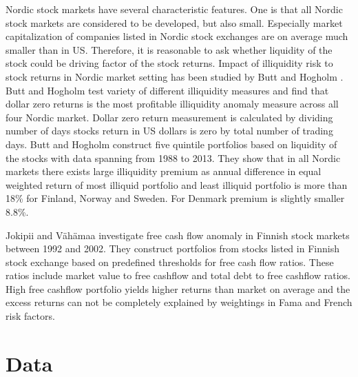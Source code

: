 \documentclass{article}
\begin{document}
Nordic stock markets have several characteristic features. One is that all Nordic stock markets are considered to be developed, but also small. Especially market capitalization of companies listed in Nordic stock exchanges are on average much smaller than in US. Therefore, it is reasonable to ask whether liquidity of the stock could be driving factor of the stock returns. Impact of illiquidity risk to stock returns in Nordic market setting has been studied by Butt and Hogholm \citeyear{ButtHogholm2020}. Butt and Hogholm test variety of different illiquidity measures and find that dollar zero returns is the most profitable illiquidity anomaly measure across all four Nordic market. Dollar zero return measurement is calculated by dividing number of days stocks return in US dollars is zero by total number of trading days. Butt and Hogholm construct five quintile portfolios based on liquidity of the stocks with data spanning from 1988 to 2013. They show that in all Nordic markets there exists large illiquidity premium as annual difference in equal weighted return of most illiquid portfolio and least illiquid portfolio is more than 18\% for Finland, Norway and Sweden. For Denmark premium is slightly smaller 8.8\%. \par

Jokipii and Vähämaa \citeyear{jokipii2006free} investigate free cash flow anomaly in Finnish stock markets between 1992 and 2002. They construct portfolios from stocks listed in Finnish stock exchange based on predefined thresholds for free cash flow ratios. These ratios include market value to free cashflow and total debt to free cashflow ratios. High free cashflow portfolio yields higher returns than market on average and the excess returns can not be completely explained by weightings in Fama and French \citeyear{FAMA19933} risk factors. \par

\section{Data}\label{Data}
\end{document}
